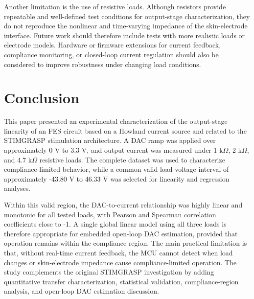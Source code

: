 \documentclass[conference]{IEEEtran}
\begin{document}
Another limitation is the use of resistive loads. Although resistors provide repeatable and well-defined test conditions for output-stage characterization, they do not reproduce the nonlinear and time-varying impedance of the skin-electrode interface. Future work should therefore include tests with more realistic loads or electrode models. Hardware or firmware extensions for current feedback, compliance monitoring, or closed-loop current regulation should also be considered to improve robustness under changing load conditions.

\section{Conclusion}

This paper presented an experimental characterization of the output-stage linearity of an FES circuit based on a Howland current source and related to the STIMGRASP stimulation architecture. A DAC ramp was applied over approximately 0 V to 3.3 V, and output current was measured under 1 k$\Omega$, 2 k$\Omega$, and 4.7 k$\Omega$ resistive loads. The complete dataset was used to characterize compliance-limited behavior, while a common valid load-voltage interval of approximately -43.80 V to 46.33 V was selected for linearity and regression analyses.

Within this valid region, the DAC-to-current relationship was highly linear and monotonic for all tested loads, with Pearson and Spearman correlation coefficients close to -1. A single global linear model using all three loads is therefore appropriate for embedded open-loop DAC estimation, provided that operation remains within the compliance region. The main practical limitation is that, without real-time current feedback, the MCU cannot detect when load changes or skin-electrode impedance cause compliance-limited operation. The study complements the original STIMGRASP investigation by adding quantitative transfer characterization, statistical validation, compliance-region analysis, and open-loop DAC estimation discussion.



\end{document}
